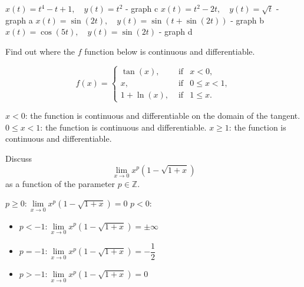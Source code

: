 \begin{Answer}

\Question  $x(t)=t^4-t+1, \quad y(t)=t^2$ \; - graph c 
\Question  $x(t)=t^2-2t,\quad y(t)=\sqrt{t}$ \; - graph a
\Question $x(t)=\sin(2t), \quad y(t)=\sin(t+\sin(2t))$ \; - graph b
\Question  $x(t)=\cos(5t),  \quad y(t)=\sin(2t)$ \; - graph d

\end{Answer}



\begin{Exercise} %
Find out where the $f$ function below is continuous and differentiable. %

\[ f(x)= \left\{\begin{array}{rcl} 
\tan(x), & \text{ if} & x<0, \\
x, & \text{ if} & 0 \leq x <1, \\
1 + \ln(x), & \text{ if} & 1 \leq x. 
\end{array}  \right.   \]
\end{Exercise} 

\begin{Answer}

\Question $x<0$: the function is continuous and differentiable on the domain of the tangent.
\Question $0 \leq x < 1$: the function is continuous and differentiable.
\Question $x \geq 1$: the function is continuous and differentiable.

\end{Answer}

\begin{Exercise} %
Discuss 
$$
\lim\limits_{x\to0}x^p\left(1-\sqrt{1+x}\right)
$$
as a function of the parameter $p\in\mathbb{Z}$. %
\end{Exercise}

\begin{Answer}

\Question $p \geq 0: \lim\limits_{x\to0}x^p\left(1-\sqrt{1+x}\right) = 0$
\Question $p < 0:$
\begin{itemize}
    \item $p <-1: \lim\limits_{x \to 0}x^p\left(1-\sqrt{1+x}\right) = \pm \infty$
    \item $p =-1: \lim\limits_{x \to 0}x^p\left(1-\sqrt{1+x}\right) = -\dfrac{1}{2}$
    \item $p >-1: \lim\limits_{x \to 0}x^p\left(1-\sqrt{1+x}\right) = 0$
\end{itemize}

\end{Answer}


